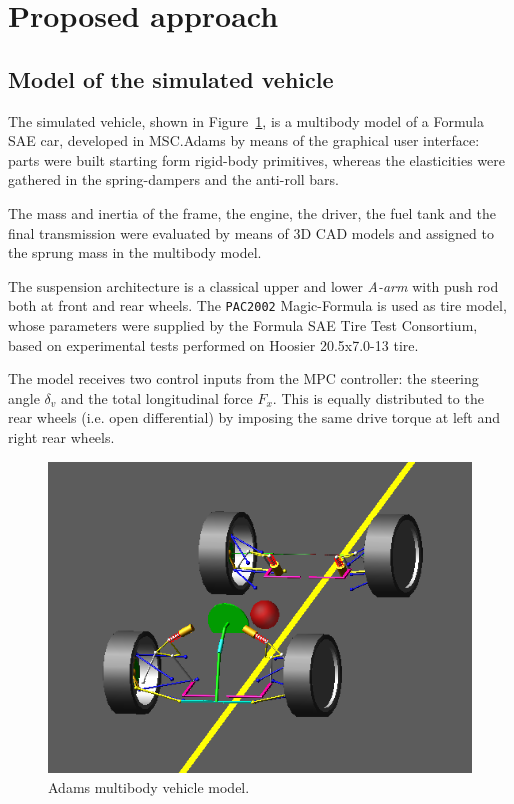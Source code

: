 \documentclass[conference]{IEEEtran} %
\begin{document}

\section{Proposed approach} %


\subsection{Model of the simulated vehicle}
The simulated vehicle, shown in Figure~\ref{fig:Adams_vehicle}, is a multibody model of a Formula SAE car, developed in MSC.Adams by means of the graphical user interface: parts were built starting form rigid-body primitives, whereas the elasticities were gathered in the spring-dampers and the anti-roll bars.

The mass and inertia of the frame, the engine, the driver, the fuel tank and the final transmission were evaluated by means of 3D CAD models and assigned to the sprung mass in the multibody model.

The suspension architecture is a classical upper and lower \emph{A-arm} with push rod both at front and rear wheels. The \texttt{PAC2002} Magic-Formula is used as tire model, whose parameters were supplied by the Formula SAE Tire Test Consortium, based on experimental tests performed on Hoosier 20.5x7.0-13 tire.

The model receives two control inputs from the MPC controller: the steering angle $\delta_v$ and the total longitudinal force $F_{x}$. This is equally distributed to the rear wheels (i.e. open differential) by imposing the same drive torque at left and right rear wheels.

\begin{figure}[htb] \centering
	
	\includegraphics[width=0.8\linewidth]{adams_vehicle}
	
	\caption{Adams multibody vehicle model.}
	
	\label{fig:Adams_vehicle}
	
\end{figure}
\end{document}
